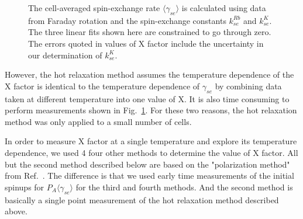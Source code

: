\begin{figure}[t!]
	\label{hotrelaxation}
	\centering
	\caption{{The cell-averaged spin-exchange rate $\langle\gamma_{se}\rangle$ is calculated using data from Faraday rotation and the spin-exchange constants $k_{se}^{Rb}$ and $k_{se}^{K}$. The three linear fits shown here are constrained to go through zero. The errors quoted in values of X factor include the uncertainty in our determination of $k_{se}^{K}$.}}
\end{figure}

However, the hot relaxation method assumes the temperature dependence of the X factor is identical to the temperature dependence of $\gamma_{se}$ by combining data taken at different temperature into one value of X. It is also time consuming to perform measurements shown in Fig.~\ref{hotrelaxation}. For these two reasons, the hot relaxation method was only applied to a small number of cells. 

In order to measure X factor at a single temperature and explore its temperature dependence, we used 4 four other methods to determine the value of X factor. All but the second method described below are based on the "polarization method" from Ref.~\cite{PhysRevLett.96.083003}. The difference is that we used early time measurements of the initial spinups for $P_A\langle\gamma_{se}\rangle$ for the third and fourth methods. And the second method is basically a single point measurement of the hot relaxation method described above.

